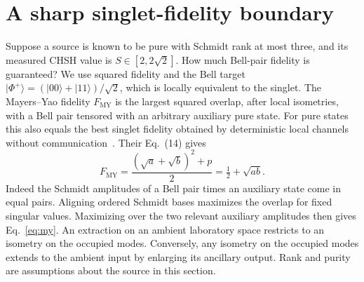 \documentclass[11pt]{article}
\newcommand{\MY}{F_{\mathrm{MY}}}
\begin{document}
\section{A sharp singlet-fidelity boundary}
Suppose a source is known to be pure with Schmidt rank at most three, and its measured CHSH value is $S\in[2,2\sqrt2]$. How much Bell-pair fidelity is guaranteed? We use squared fidelity and the Bell target $\lvert\Phi^+\rangle=(\lvert00\rangle+\lvert11\rangle)/\sqrt2$, which is locally equivalent to the singlet. The Mayers--Yao fidelity $\MY$ is the largest squared overlap, after local isometries, with a Bell pair tensored with an arbitrary auxiliary pure state. For pure states this also equals the best singlet fidelity obtained by deterministic local channels without communication~\cite[Apps.~A,B]{bardyn}. Their Eq.~(14) gives
\begin{equation}
    \MY=\frac{(\sqrt a+\sqrt b)^2+p}{2}=\tfrac12+\sqrt{ab}.
    \label{eq:my}
\end{equation}
Indeed the Schmidt amplitudes of a Bell pair times an auxiliary state come in equal pairs. Aligning ordered Schmidt bases maximizes the overlap for fixed singular values. Maximizing over the two relevant auxiliary amplitudes then gives Eq.~\eqref{eq:my}. An extraction on an ambient laboratory space restricts to an isometry on the occupied modes. Conversely, any isometry on the occupied modes extends to the ambient input by enlarging its ancillary output. Rank and purity are assumptions about the source in this section.
\end{document}
